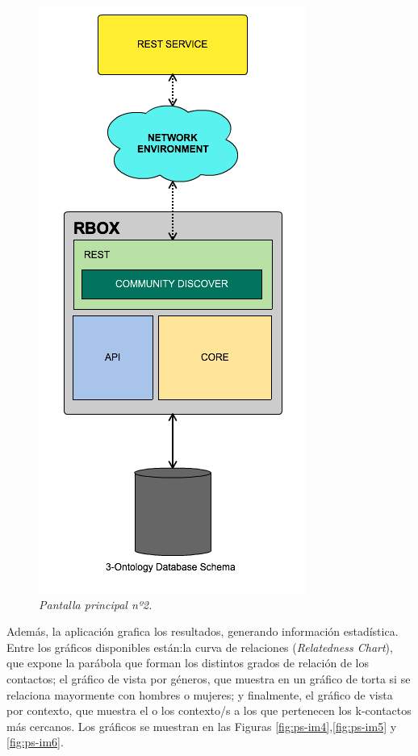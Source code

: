 \begin{figure}[H]
	\centering
	\includegraphics[scale=.4]{images/Figura6-3}
	\caption{\em Pantalla principal nº2.}
	\label{fig:ps-im3}
\end{figure}

Además, la aplicación grafica los resultados, generando información estadística. Entre los gráficos disponibles están:la curva de relaciones (\textit{Relatedness Chart}), que expone la parábola que forman los distintos grados de relación de los contactos; el gráfico de vista por géneros, que muestra en un gráfico de torta si se relaciona mayormente con hombres o mujeres; y finalmente, el gráfico de vista por contexto, que muestra el o los contexto/s a los que pertenecen los k-contactos más cercanos. Los gráficos se muestran en las Figuras \ref{fig:ps-im4},\ref{fig:ps-im5} y \ref{fig:ps-im6}.

